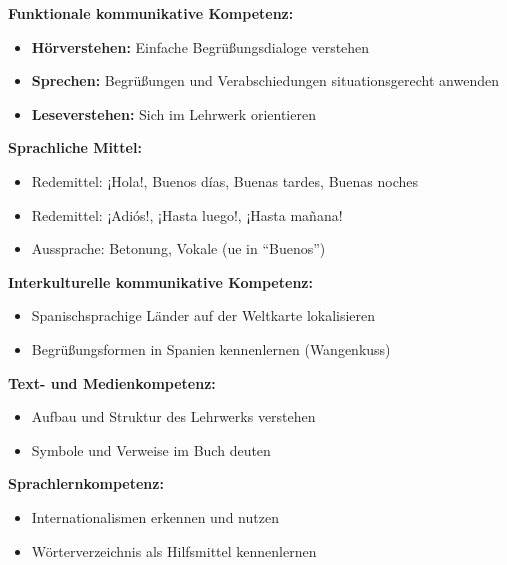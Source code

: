 \documentclass[11pt,a4paper]{article}
\begin{document}
\vspace{1em}

\begin{kompetenzbox}

\textbf{Funktionale kommunikative Kompetenz:}
\begin{itemize}[nosep]
    \item \textbf{Hörverstehen:} Einfache Begrüßungsdialoge verstehen
    \item \textbf{Sprechen:} Begrüßungen und Verabschiedungen situationsgerecht anwenden
    \item \textbf{Leseverstehen:} Sich im Lehrwerk orientieren
\end{itemize}

\textbf{Sprachliche Mittel:}
\begin{itemize}[nosep]
    \item Redemittel: ¡Hola!, Buenos días, Buenas tardes, Buenas noches
    \item Redemittel: ¡Adiós!, ¡Hasta luego!, ¡Hasta mañana!
    \item Aussprache: Betonung, Vokale (ue in ``Buenos'')
\end{itemize}

\textbf{Interkulturelle kommunikative Kompetenz:}
\begin{itemize}[nosep]
    \item Spanischsprachige Länder auf der Weltkarte lokalisieren
    \item Begrüßungsformen in Spanien kennenlernen (Wangenkuss)
\end{itemize}

\textbf{Text- und Medienkompetenz:}
\begin{itemize}[nosep]
    \item Aufbau und Struktur des Lehrwerks verstehen
    \item Symbole und Verweise im Buch deuten
\end{itemize}

\textbf{Sprachlernkompetenz:}
\begin{itemize}[nosep]
    \item Internationalismen erkennen und nutzen
    \item Wörterverzeichnis als Hilfsmittel kennenlernen
\end{itemize}

\end{kompetenzbox}
\end{document}
